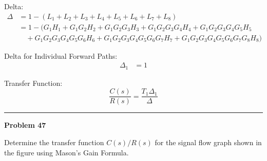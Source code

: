 ﻿\documentclass[11pt]{article}
\begin{document}
Delta:
{\small
\begin{align*}
\Delta &= 1 - (L_1 + L_2 + L_3 + L_4 + L_5 + L_6 + L_7 + L_8) \\
       &= 1 - (G_1 H_1 + G_1 G_2 H_2 + G_1 G_2 G_3 H_3 + G_1 G_2 G_3 G_4 H_4 + G_1 G_2 G_3 G_4 G_5 H_5 \\
       &\quad + G_1 G_2 G_3 G_4 G_5 G_6 H_6 + G_1 G_2 G_3 G_4 G_5 G_6 G_7 H_7 + G_1 G_2 G_3 G_4 G_5 G_6 G_7 G_8 H_8)
\end{align*}
}

\vspace{0.5em}

Delta for Individual Forward Paths:
\begin{align*}
\Delta_1 &= 1
\end{align*}

\vspace{0.5em}

Transfer Function:
\[
\frac{C(s)}{R(s)} = \frac{T_1 \Delta_1}{\Delta}
\]

\noindent{}

\newpage
  \setcounter{page}{72}  
\noindent\rule{\textwidth}{1pt}
\noindent\textbf{Problem 47} \hfill

\noindent Determine the transfer function $C(s)/R(s)$ for the signal flow graph shown in the figure using Mason's Gain Formula.

\end{document}

